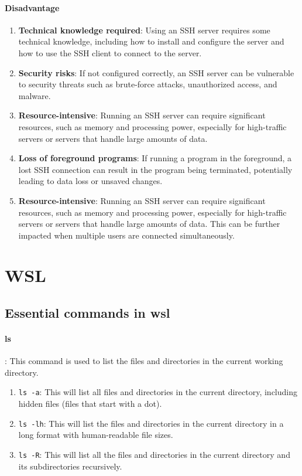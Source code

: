 \documentclass[10pt, a4paper]{article}
\begin{document}
\paragraph*{Disadvantage}
\begin{enumerate}
    \item \textbf{Technical knowledge required}: Using an SSH server requires some technical knowledge, including how to install and configure the server and how to use the SSH client to connect to the server.
    \item \textbf{Security risks}: If not configured correctly, an SSH server can be vulnerable to security threats such as brute-force attacks, unauthorized access, and malware.
    \item \textbf{Resource-intensive}: Running an SSH server can require significant resources, such as memory and processing power, especially for high-traffic servers or servers that handle large amounts of data.
    \item \textbf{Loss of foreground programs}: If running a program in the foreground, a lost SSH connection can result in the program being terminated, potentially leading to data loss or unsaved changes.
    \item \textbf{Resource-intensive}: Running an SSH server can require significant resources, such as memory and processing power, especially for high-traffic servers or servers that handle large amounts of data. This can be further impacted when multiple users are connected simultaneously.
\end{enumerate}

\newpage
\section*{WSL}
\subsection*{Essential commands in wsl}

\paragraph{ls}: This command is used to list the files and directories in the current working directory.
\begin{enumerate}
    \item \texttt{ls -a}: This will list all files and directories in the current directory, including hidden files (files that start with a dot).
    \item \texttt{ls -lh}: This will list the files and directories in the current directory in a long format with human-readable file sizes.
    \item \texttt{ls -R}: This will list all the files and directories in the current directory and its subdirectories recursively.
\end{enumerate}
\end{document}
